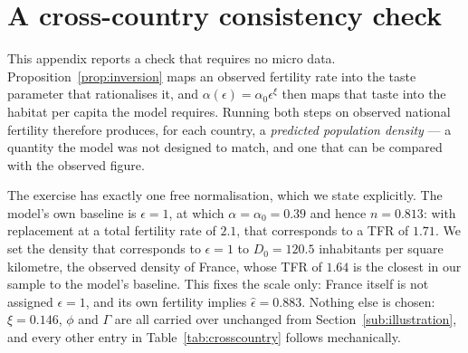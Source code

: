 \documentclass[11pt]{article}
\begin{document}
\clearpage
\section{A cross-country consistency check}
\label{app:crosscountry}\label{sub:crosscountry}
\setcounter{table}{0}

This appendix reports a check that requires no micro data. Proposition~\ref{prop:inversion} maps an
observed fertility rate into the taste parameter that rationalises it, and
$\alpha(\epsilon)=\alpha_0\epsilon^{\xi}$ then maps that taste into the habitat per capita the model
requires. Running both steps on observed national fertility therefore produces, for each country, a
\emph{predicted population density} --- a quantity the model was not designed to match, and one
that can be compared with the observed figure.

The exercise has exactly one free normalisation, which we state explicitly. The model's own baseline
is $\epsilon=1$, at which $\alpha=\alpha_0=0.39$ and hence $n=0.813$: with replacement at a total
fertility rate of $2.1$, that corresponds to a TFR of $1.71$. We set the density that
corresponds to $\epsilon=1$ to $D_0=120.5$ inhabitants per square kilometre, the observed density of
France, whose TFR of $1.64$ is the closest in our sample to the model's baseline. This fixes the scale
only: France itself is not assigned $\epsilon=1$, and its own fertility implies $\hat\epsilon=0.883$.
Nothing else is chosen: $\xi=0.146$, $\phi$ and
$\Gamma$ are all carried over unchanged from Section~\ref{sub:illustration}, and every other entry in
Table~\ref{tab:crosscountry} follows mechanically.
\end{document}
